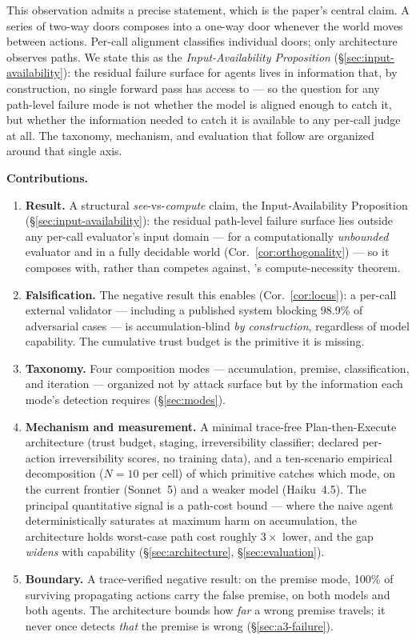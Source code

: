 \documentclass[11pt]{article}
\begin{document}
This observation admits a precise statement, which is the paper's central claim. A series of two-way doors composes into a one-way door whenever the world moves between actions. Per-call alignment classifies individual doors; only architecture observes paths. We state this as the \emph{Input-Availability Proposition} (\S\ref{sec:input-availability}): the residual failure surface for agents lives in information that, by construction, no single forward pass has access to --- so the question for any path-level failure mode is not whether the model is aligned enough to catch it, but whether the information needed to catch it is available to any per-call judge at all. The taxonomy, mechanism, and evaluation that follow are organized around that single axis.

\medskip
\noindent\textbf{Contributions.}
\begin{enumerate}[leftmargin=*]
  \item \textbf{Result.} A structural \emph{see}-vs-\emph{compute} claim, the Input-Availability Proposition (\S\ref{sec:input-availability}): the residual path-level failure surface lies outside any per-call evaluator's input domain --- for a computationally \emph{unbounded} evaluator and in a fully decidable world (Cor.~\ref{cor:orthogonality}) --- so it composes with, rather than competes against, \citet{mccann2026governance}'s compute-necessity theorem.
  \item \textbf{Falsification.} The negative result this enables (Cor.~\ref{cor:locus}): a per-call external validator --- including a published system blocking 98.9\% of adversarial cases \citep{fokou2026parallax} --- is accumulation-blind \emph{by construction}, regardless of model capability. The cumulative trust budget is the primitive it is missing.
  \item \textbf{Taxonomy.} Four composition modes --- accumulation, premise, classification, and iteration --- organized not by attack surface but by the information each mode's detection requires (\S\ref{sec:modes}).
  \item \textbf{Mechanism and measurement.} A minimal trace-free Plan-then-Execute architecture (trust budget, staging, irreversibility classifier; declared per-action irreversibility scores, no training data), and a ten-scenario empirical decomposition ($N = 10$ per cell) of which primitive catches which mode, on the current frontier (Sonnet~5) and a weaker model (Haiku~4.5). The principal quantitative signal is a path-cost bound --- where the naive agent deterministically saturates at maximum harm on accumulation, the architecture holds worst-case path cost roughly $3\times$ lower, and the gap \emph{widens} with capability (\S\ref{sec:architecture}, \S\ref{sec:evaluation}).
  \item \textbf{Boundary.} A trace-verified negative result: on the premise mode, 100\% of surviving propagating actions carry the false premise, on both models and both agents. The architecture bounds how \emph{far} a wrong premise travels; it never once detects \emph{that} the premise is wrong (\S\ref{sec:a3-failure}).
\end{enumerate}
\end{document}
